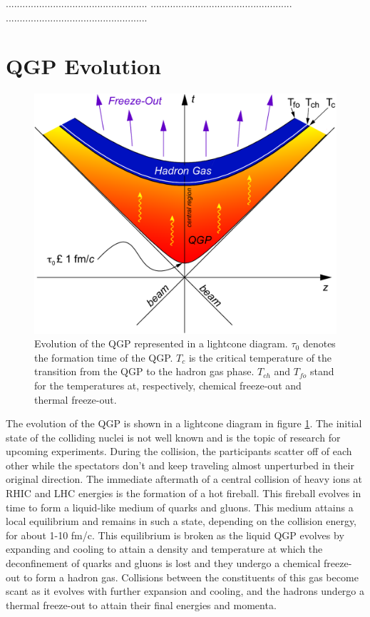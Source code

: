 ...................................................
...................................................
...................................................

\section{QGP Evolution}
\begin{figure}[h]
  \centering
  \includegraphics[width=6.5in]{figures/LightCone1_color-crop_NThesis.pdf}
  \caption{Evolution of the QGP represented in a lightcone diagram. $\tau_{0}$ denotes the formation time of the QGP. $T_{c}$ is the critical temperature of the transition from the QGP to the hadron gas phase. $T_{ch}$ and $T_{fo}$ stand for the temperatures at, respectively, chemical freeze-out and thermal freeze-out. \cite{Connors:2017ptx}}\label{fig:lightcone}
\end{figure}
The evolution of the QGP is shown in a lightcone diagram in figure \ref{fig:lightcone}.
The initial state of the colliding nuclei is not well known and is the topic of research for upcoming experiments. During the collision, the participants scatter off of each other while the spectators don't and keep traveling almost unperturbed in their original direction. The immediate aftermath of a central collision of heavy ions at RHIC and LHC energies is the formation of a hot fireball. This fireball evolves in time to form a liquid-like medium of quarks and gluons. This medium attains a local equilibrium and remains in such a state, depending on the collision energy, for about 1-10 fm/c. This equilibrium is broken as the liquid QGP evolves by expanding and cooling to attain a density and temperature at which the deconfinement of quarks and gluons is lost and they undergo a chemical freeze-out to form a hadron gas. Collisions between the constituents of this gas become scant as it evolves with further expansion and cooling, and the hadrons undergo a thermal freeze-out to attain their final energies and momenta.

